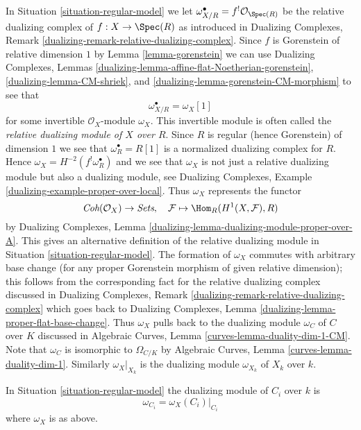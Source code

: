 \noindent
In Situation \ref{situation-regular-model} we let
$\omega_{X/R}^\bullet = f^!\mathcal{O}_{\Spec(R)}$
be the relative dualizing complex of $f : X \to \Spec(R)$
as introduced in
Dualizing Complexes, Remark \ref{dualizing-remark-relative-dualizing-complex}.
Since $f$ is Gorenstein of relative dimension $1$
by Lemma \ref{lemma-gorenstein} we can use
Dualizing Complexes, Lemmas
\ref{dualizing-lemma-affine-flat-Noetherian-gorenstein},
\ref{dualizing-lemma-CM-shriek}, and
\ref{dualizing-lemma-gorenstein-CM-morphism}
to see that
$$
\omega_{X/R}^\bullet = \omega_X[1]
$$
for some invertible $\mathcal{O}_X$-module $\omega_X$.
This invertible module is often called the
{\it relative dualizing module of $X$ over $R$}.
Since $R$ is regular (hence Gorenstein) of dimension $1$
we see that $\omega_R^\bullet = R[1]$ is a
normalized dualizing complex for $R$. Hence
$\omega_X = H^{-2}(f^!\omega_R^\bullet)$ and we
see that $\omega_X$ is not just a relative dualizing module
but also a dualizing module, see
Dualizing Complexes, Example \ref{dualizing-example-proper-over-local}.
Thus $\omega_X$ represents the functor
$$
\textit{Coh}(\mathcal{O}_X) \to \textit{Sets},\quad
\mathcal{F} \mapsto \Hom_R(H^1(X, \mathcal{F}), R)
$$
by Dualizing Complexes, Lemma
\ref{dualizing-lemma-dualizing-module-proper-over-A}.
This gives an alternative definition of the relative
dualizing module in Situation \ref{situation-regular-model}.
The formation of $\omega_X$ commutes with arbitrary base change
(for any proper Gorenstein morphism of given relative dimension);
this follows from the corresponding fact for the relative dualizing
complex discussed in
Dualizing Complexes, Remark \ref{dualizing-remark-relative-dualizing-complex}
which goes back to
Dualizing Complexes, Lemma \ref{dualizing-lemma-proper-flat-base-change}.
Thus $\omega_X$ pulls back to the dualizing module $\omega_C$ of $C$ over $K$
discussed in Algebraic Curves, Lemma \ref{curves-lemma-duality-dim-1-CM}.
Note that $\omega_C$ is isomorphic to $\Omega_{C/K}$ by
Algebraic Curves, Lemma \ref{curves-lemma-duality-dim-1}.
Similarly $\omega_X|_{X_k}$ is the dualizing module $\omega_{X_k}$
of $X_k$ over $k$.

\begin{lemma}
\label{lemma-dualizing-components}
In Situation \ref{situation-regular-model} the dualizing module of
$C_i$ over $k$ is
$$
\omega_{C_i} = \omega_X(C_i)|_{C_i}
$$
where $\omega_X$ is as above.
\end{lemma}

